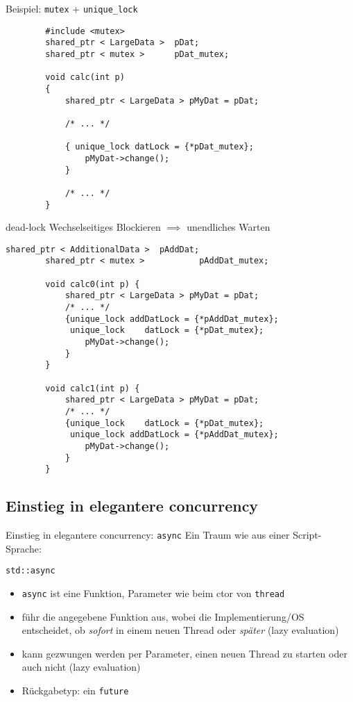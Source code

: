 \begin{frame}[fragile]{ Beispiel: \texttt{mutex} + \texttt{unique\_lock} }
	\begin{lstlisting}
		#include <mutex>
		shared_ptr < LargeData >  pDat;
		shared_ptr < mutex >      pDat_mutex;
		
		void calc(int p)
		{
		    shared_ptr < LargeData > pMyDat = pDat;
			
		    /* ... */
			
		    { unique_lock datLock = {*pDat_mutex};
		        pMyDat->change();
		    }
			
		    /* ... */
		}
	\end{lstlisting}
\end{frame}

\begin{frame}[fragile]{dead-lock}
	\alert{Wechselseitiges Blockieren $\implies$ unendliches Warten}
	
	\begin{lstlisting}[basicstyle=\scriptsize]
		shared_ptr < AdditionalData >  pAddDat;
		shared_ptr < mutex >           pAddDat_mutex;
		
		void calc0(int p) {
		    shared_ptr < LargeData > pMyDat = pDat;
		    /* ... */
		    {unique_lock addDatLock = {*pAddDat_mutex};
		     unique_lock    datLock = {*pDat_mutex};
		        pMyDat->change();
		    }
		}
		
		void calc1(int p) {
		    shared_ptr < LargeData > pMyDat = pDat;
		    /* ... */
		    {unique_lock    datLock = {*pDat_mutex};
		     unique_lock addDatLock = {*pAddDat_mutex};
		        pMyDat->change();
		    }
		}
	\end{lstlisting}
\end{frame}


\subsection{Einstieg in elegantere concurrency}

\begin{frame}{Einstieg in elegantere concurrency: \texttt{async}}
	Ein Traum wie aus einer Script-Sprache:
	\begin{block}{ \texttt{std::async} }
		\begin{itemize}
			\item \texttt{async} ist eine Funktion, Parameter wie beim ctor von \texttt{thread}
			\item führ die angegebene Funktion aus, wobei die Implementierung/OS entscheidet, ob \emph{sofort} in einem neuen Thread oder \emph{später} (lazy evaluation)
			\item kann gezwungen werden per Parameter, einen neuen Thread zu starten oder auch nicht (lazy evaluation)
			\item Rückgabetyp: ein \texttt{future}
		\end{itemize}
	\end{block}
\end{frame}

